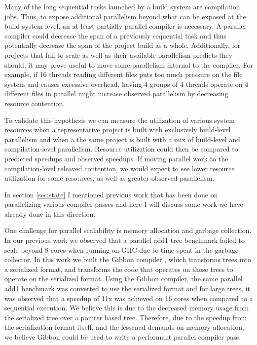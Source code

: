 \documentclass[10pt]{article}
\begin{document}
Many of the long sequential tasks launched by a build system are compilation jobs.  Thus, to
expose additional parallelism beyond what can be exposed at the build system level, an at least
partially parallel compiler is necessary.  A parallel compiler could decrease the span
of a previously sequential task and thus potentially decrease the span of the project build as a
whole.  Additionally, for projects that fail to scale as well as their available parallelism
predicts they should, it may prove useful to move some parallelism internal to the compiler.
For example, if 16 threads reading different files puts too much pressure on the file
system and causes excessive overhead, having 4 groups of 4 threads operate on 4 different files
in parallel might increase observed parallelism by decreasing resource contention.


To validate this hypothesis we can measure the utilization of various system resources when
a representative project is built with exclusively build-level parallelism and when a
the same project is built with a mix of build-level and compilation-level parallelism.  Resource utilization
could then be compared to predicted speedups and observed speedups.  If moving parallel work
to the compilation-level releaved contention, we would expect to see lower resource utilization
for some resources, as well as greater observed parallelism.


In section \ref{sec:state} I mentioned previous work that has been done on parallelizing various compiler
passes and here I will discuss some work we have already done in this direction. 

One challenge for parallel scalability is memory allocation and garbage collection.  In our previous work \cite{vollmer2017compiling}
we observed that a parallel add1 tree benchmark failed to scale beyond 8 cores when running on GHC due to
time spent in the garbage collector.  In this work we built the Gibbon compiler \cite{vollmer2017compiling},
which transforms trees into a serialized format, and transforms the code that operates on those trees to operate
on the serialized format.  Using the Gibbon compiler, the same parallel add1 benchmark was converted to
use the serialized format and for large trees, it was observed that a speedup of 11x was achieved on 16 cores
when compared to a sequential execution.  We believe this is due to the decreased memory usage from the
serialized tree over a pointer based tree.  Therefore, due to the speedup from the serialization format
itself, and the lessened demands on memory allocation, we believe Gibbon could be used to write a performant
parallel compiler pass.
\end{document}

